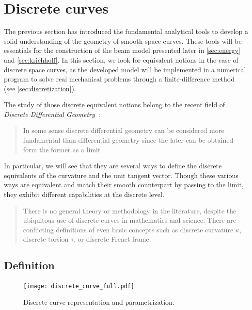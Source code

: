 \section{Discrete curves}

The previous section has introduced the fundamental analytical tools to develop a solid understanding of the geometry of smooth space curves. These tools will be essentials for the construction of the beam model presented later in \cref{sec:energy} and \cref{sec:krichhoff}. In this section, we look for equivalent notions in the case of discrete space curves, as the developed model will be implemented in a numerical program to solve real mechanical problems through a finite-difference method (see \cref{sec:discretization}).

The study of those discrete equivalent notions belong to the recent field of \emph{Discrete Differential Geometry}~: \blockcquote[p.7]{Hoffmann2008}{In some sense discrete differential geometry can be considered more fundamental than differential geometry since the later can be obtained form the former as a limit}. In particular, we will see that they are several ways to define the discrete equivalents of the curvature and the unit tangent vector. Though these various ways are equivalent and match their smooth counterpart by passing to the limit, they exhibit different capabilities at the discrete level.

 \blockcquote[p.1]{Carroll2014}{There is no general theory or methodology in the literature, despite the ubiquitous use of discrete curves in mathematics and science. There are conflicting definitions of even basic concepts such as discrete curvature $\kappa$, discrete torsion $\tau$, or discrete Frenet frame.}.


\subsection{Definition}
\begin{figure}[t]
	\centering
	\texttt{[image: discrete\_curve\_full.pdf]}
	\caption{Discrete curve representation and parametrization.}
	\label{fig:discrete_curve}
\end{figure}

